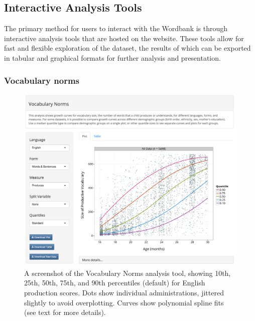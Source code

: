 \documentclass[man,noapacite]{apa}
\begin{document}
\subsection{Interactive Analysis Tools}

The primary method for users to interact with the Wordbank is through interactive analysis tools that are hosted on the website. These tools allow for fast and flexible exploration of the dataset, the results of which can be exported in tabular and graphical formats for further analysis and presentation. 

\subsubsection{Vocabulary norms}

\begin{figure}[h!]
\includegraphics[width=6in]{figures/normsapp.png}
\caption{\label{fig:norms} A screenshot of the Vocabulary Norms analysis tool, showing 10th, 25th, 50th, 75th, and 90th percentiles (default) for English production scores. Dots show individual administrations, jittered slightly to avoid overplotting. Curves show polynomial spline fits (see text for more details).}
\end{figure}
\end{document}
